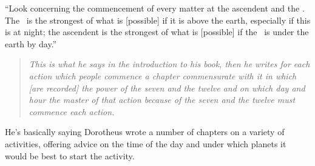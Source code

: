 ``Look  concerning the commencement of every matter at the ascendent and the \Moon. The \Moon\, is the strongest of what is [possible] if it is above the earth, especially if this is at night; the ascendent is the strongest of what is [possible] if the \Moon\, is under the earth by day.''

\begin{quote}
\textsl{This is what he says in the introduction to his book, then he writes for each action which people commence a chapter commensurate with it in which [are recorded] the power of the seven and the twelve and on which day and hour the master of that action because of the seven and the twelve must commence each action.}
\end{quote}

\begin{mdframed}[backgroundcolor=cyan!5, rightmargin=1em, leftmargin=1em]
He's basically saying Dorotheus wrote a number of chapters on a variety of activities, offering advice on the time of the day and under which planets it would be best to start the activity.
\end{mdframed}








